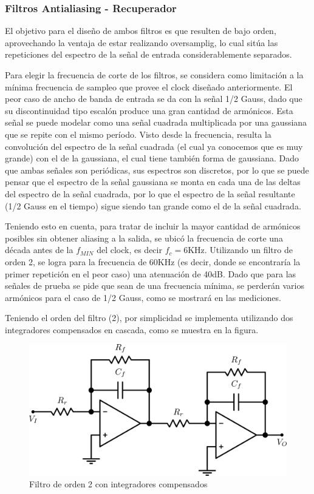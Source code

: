 \documentclass[assd_tp3_main.tex]{subfiles}
\begin{document}
\subsubsection{Filtros Antialiasing - Recuperador}

El objetivo para el diseño de ambos filtros es que resulten de bajo orden, aprovechando la ventaja de estar realizando oversamplig, lo cual sitúa las repeticiones del espectro de la señal de entrada considerablemente separados.\par
Para elegir la frecuencia de corte de los filtros, se considera como limitación a la mínima frecuencia de sampleo que provee el clock diseñado anteriormente. El peor caso de ancho de banda de entrada se da con la señal 1/2 Gauss, dado que su discontinuidad tipo escalón produce una gran cantidad de armónicos. Esta señal se puede modelar como una señal cuadrada multiplicada por una gaussiana que se repite con el mismo período. Visto desde la frecuencia, resulta la convolución del espectro de la señal cuadrada (el cual ya conocemos que es muy grande) con el de la gaussiana, el cual tiene también forma de gaussiana. Dado que ambas señales son periódicas, sus espectros son discretos, por lo que se puede pensar que el espectro de la señal gaussiana se monta en cada una de las deltas del espectro de la señal cuadrada, por lo que el espectro de la señal resultante (1/2 Gauss en el tiempo) sigue siendo tan grande como el de la señal cuadrada.\par
Teniendo esto en cuenta, para tratar de incluir la mayor cantidad de armónicos posibles sin obtener aliasing a la salida, se ubicó la frecuencia de corte una década antes de la $f_{MIN}$ del clock, es decir $f_c = 6$KHz. Utilizando un filtro de orden 2, se logra para la frecuencia de 60KHz (es decir, donde se encontraría la primer repetición en el peor caso) una atenuación de 40dB. Dado que para las señales de prueba se pide que sean de una frecuencia mínima, se perderán varios armónicos para el caso de 1/2 Gauss, como se mostrará en las mediciones.\par
Teniendo el orden del filtro (2), por simplicidad se implementa utilizando dos integradores compensados en cascada, como se muestra en la figura.

\begin{figure}[!ht]
\begin{centering}
\includegraphics[scale=0.45]{images/ej5/Filtro.png}
\par\end{centering}
\caption{Filtro de orden 2 con integradores compensados}
\end{figure}
\end{document}
